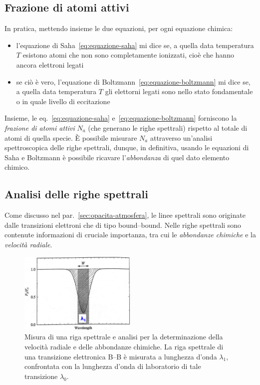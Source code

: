 \subsection{Frazione di atomi attivi}\label{sec:frazione-atomi-attivi}
In pratica, mettendo insieme le due equazioni, per ogni equazione chimica:
\begin{itemize}
    \item l'equazione di Saha~\eqref{eq:equazione-saha} mi dice se, a quella data temperatura $T$ esistono atomi che non sono completamente ionizzati, cioè che hanno ancora elettroni legati
    \item se ciò è vero, l'equazione di Boltzmann~\eqref{eq:equazione-boltzmann} mi dice se, a quella data temperatura $T$ gli elettorni legati sono nello stato fondamentale o in quale livello di eccitazione
\end{itemize}
Insieme, le eq.~\eqref{eq:equazione-saha} e~\eqref{eq:equazione-boltzmann} forniscono la \emph{frazione di atomi attivi} $N_a$ (che generano le righe spettrali) rispetto al totale di atomi di quella specie. È possibile misurare $N_a$ attraverso un'analisi spettroscopica delle righe spettrali, dunque, in definitiva, usando le equazioni di Saha e Boltzmann è possibile ricavare l'\emph{abbondanza} di quel dato elemento chimico. 

\subsection{Analisi delle righe spettrali}
Come discusso nel par.~\ref{sec:opacita-atmosfera}, le linee spettrali sono originate dalle transizioni elettroni che di tipo bound--bound. Nelle righe spettrali sono contenute informazioni di cruciale importanza, tra cui le \emph{abbondanze chimiche} e la \emph{velocità radiale}.

\begin{figure}
    \centering
    \includegraphics[width=0.5\textwidth]{immagini/righe-spettrali.png}
    \caption{Misura di una riga spettrale e analisi per la determinazione della velocità radiale e delle abbondanze chimiche. La riga spettrale di una transizione elettronica B--B è misurata a lunghezza d'onda $\lambda_1$, confrontata con la lunghezza d'onda di laboratorio di tale transizione $\lambda_0$.}
    \label{fig:righe-spettrali}
    
\end{figure}

